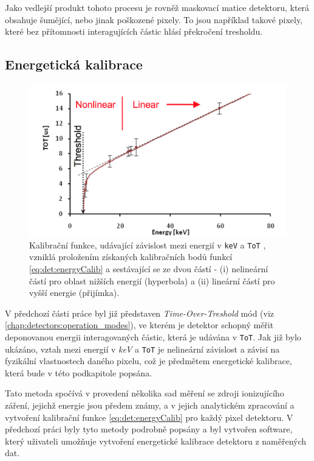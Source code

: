Jako vedlejší produkt tohoto procesu je rovněž maskovací matice detektoru, která obsahuje šumějící, nebo jinak poškozené pixely. To jsou například takové pixely, které bez přítomnosti interagujících částic hlásí překročení tresholdu.

\subsection{Energetická kalibrace}\label{chap:detectors:calibration:energy}
\begin{figure}[th]
	\begin{center}
		\includegraphics[width=13cm]{figures/calib_function.png}
		\caption{Kalibrační funkce, udávající závislost mezi energií v \texttt{keV} a \texttt{ToT} \cite{Jakubek2011S262}, vzniklá proložením získaných kalibračních bodů funkcí \ref{eq:det:energyCalib} a sestávající se ze dvou částí - (i) nelineární částí pro oblast nižších energií (hyperbola) a (ii) lineární částí pro vyšší energie (přijímka).}
		\label{fig:det:calib:calib_function}
	\end{center}
\end{figure}

V předchozí části práce byl již představen \textit{Time-Over-Treshold} mód (viz \ref{chap:detectors:operation_modes}), ve kterém je detektor schopný měřit deponovanou energii interagovaných částic, která je udávána v \texttt{ToT}. Jak již bylo ukázáno, vztah mezi energií v \textit{keV} a \texttt{ToT} je nelineární závislost a závisí na fyzikální vlastnostech daného pixelu, což je předmětem energetické kalibrace, která bude v této podkapitole popsána.

Tato metoda \cite{Jakubek2011S262} spočívá v provedení několika sad měření se zdroji ionizujícího záření, jejichž energie jsou předem známy, a v jejich analytickém zpracování a vytvoření kalibrační funkce \ref{eq:det:energyCalib} pro každý pixel detektoru. V předchozí práci \cite{BegeraBcThesis2016} byly tyto metody podrobně popsány a byl vytvořen software, který uživateli umožňuje vytvoření energetické kalibrace detektoru z naměřených dat.

